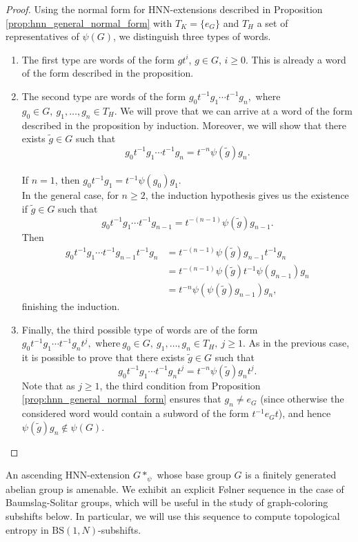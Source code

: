 \documentclass[cupthm,crop,info]{CUP-JNL-ETS}%
\theoremstyle{cupplain}
\theoremstyle{cupdefinition}
\theoremstyle{cupremark}
\theoremstyle{cupproof}
\newtheorem{proof}{Proof}
\numberwithin{equation}{section}
\newcommand{\BS}[1][N]{\mathrm{BS}(1,#1)}
\begin{document}
\begin{proof}
	Using the normal form for HNN-extensions described in Proposition \ref{prop:hnn_general_normal_form} with  $T_K=\{e_{G}\}$ and $T_H$ a set of representatives of $\psi(G)$, we distinguish three types of words.
	\begin{enumerate}[1.]
		\item The first type are words of the form $gt^i$, $g\in G$, $i\ge 0$. This is already a word of the form described in the proposition.
		\item The second type are words of the form $
		g_0t^{-1}g_1\cdots t^{-1}g_n,$ where $ g_0\in G, \ g_1,\ldots,g_n\in T_H.$
		We will prove that we can arrive at a word of the form described in the proposition by induction. Moreover, we will show that there exists $\tilde{g}\in G$ such that
		$$
		g_0t^{-1}g_1\cdots t^{-1}g_n=t^{-n}\psi(\tilde{g})g_n.
		$$\\
		
		If $n=1$, then $g_0t^{-1}g_1=t^{-1}\psi(g_0)g_1$.\\
		
		In the general case, for $n\ge 2$, the induction hypothesis gives us the existence if $\tilde{g}\in G$ such that
		$$
		g_0t^{-1}g_1\cdots t^{-1}g_{n-1}=t^{-(n-1)}\psi(\tilde{g})g_{n-1}.
		$$
		Then
		\begin{align*}
		g_0t^{-1}g_1\cdots t^{-1}g_{n-1}t^{-1}g_n&=t^{-(n-1)}\psi(\tilde{g})g_{n-1}t^{-1}g_n\\
		&=t^{-(n-1)}\psi(\tilde{g})t^{-1}\psi(g_{n-1})g_n\\
		&=t^{-n}\psi(\psi(\tilde{g})g_{n-1})g_n,
		\end{align*}
		finishing the induction.
		\item Finally, the third possible type of words are of the form $
		g_0t^{-1}g_1\cdots t^{-1}g_nt^{j}, \text{ where} \ g_0\in G, \ g_1,\ldots,g_n\in T_H, \ j\ge 1.
		$
		As in the previous case, it is possible to prove that there exists $\tilde{g}\in G$ such that
		$$
		g_0t^{-1}g_1\cdots t^{-1}g_nt^{j}=t^{-n}\psi(\tilde{g})g_nt^j.
		$$
		Note that as $j\ge 1$, the third condition from Proposition \ref{prop:hnn_general_normal_form} ensures that $g_n\neq e_G$ (since otherwise the considered word would contain a subword of the form $t^{-1}e_Gt$), and hence $\psi(\tilde{g})g_n\notin \psi(G)$.
	\end{enumerate}
\end{proof}

An ascending HNN-extension $G*_{\psi}$ whose base group $G$ is a finitely generated abelian group is amenable. We exhibit an explicit F\o lner sequence in the case of Baumslag-Solitar groups, which will be useful in the study of graph-coloring subshifts below. In particular, we will use this sequence to compute topological entropy in $\BS$-subshifts.
\end{document}
